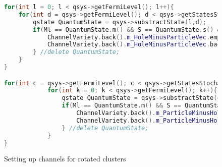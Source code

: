 \documentclass[twoside,english]{uiofysmaster}
\theoremstyle{definition}
\begin{document}
\begin{figure}
	\begin{lstlisting}[language=C++]
for(int l = 0; l < qsys->getFermiLevel(); l++){
	for(int d = qsys->getFermiLevel(); d < qsys->getStatesStochastic(); d++){
		qstate QuantumState = qsys->substractState(l,d);
		if(Ml == QuantumState.m() && S == QuantumState.s() && l != d){
			ChannelVariety.back().m_HoleMinusParticleVec.emplace_back(channelindexpair());
			ChannelVariety.back().m_HoleMinusParticleVec.back().set(l, d);
		} //delete QuantumState;
	}
}

for(int c = qsys->getFermiLevel(); c < qsys->getStatesStochastic(); c++){
         	for(int k = 0; k < qsys->getFermiLevel(); k++){
         		qstate QuantumState = qsys->substractState(c,k);
         		if(Ml == QuantumState.m() && S == QuantumState.s() && c != k){
         			ChannelVariety.back().m_ParticleMinusHoleVec.emplace_back(channelindexpair());
         			ChannelVariety.back().m_ParticleMinusHoleVec.back().set(c, k);
         		} //delete QuantumState;
         	}
}
\end{lstlisting}
\caption{Setting up channels for rotated clusters} \label{f:vectors_for_channelsHminusP}
\end{figure}
\end{document}
